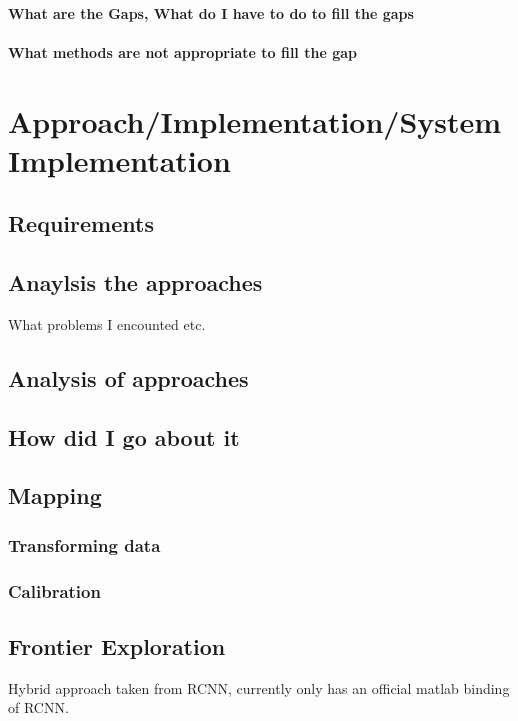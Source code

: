 \documentclass{mproj}
\begin{document}
\subsubsection{What are the Gaps, What do I have to do to fill the gaps}
\subsubsection{What methods are not appropriate to fill the gap}




\chapter{Approach/Implementation/System Implementation}

\section{Requirements}


\section{Anaylsis the approaches}

What problems I encounted etc.

\section{Analysis of approaches}
\section{How did I go about it}

\section{Mapping}
\subsection{Transforming data}
\subsection{Calibration}

\section{Frontier Exploration}
Hybrid approach taken from RCNN, currently only has an official matlab binding of RCNN.
\end{document}
